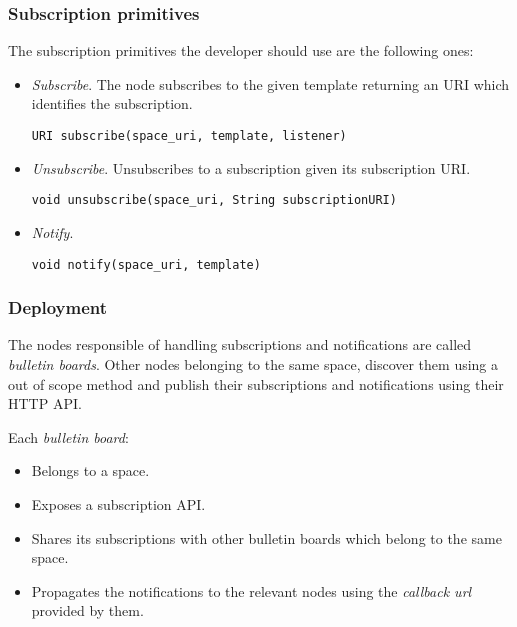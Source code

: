 \subsubsection{Subscription primitives}

The subscription primitives the developer should use are the following ones:
\begin{itemize}
  \item \emph{Subscribe}. The node subscribes to the given template returning an URI which identifies the subscription.
    \begin{verbatim}
URI subscribe(space_uri, template, listener)
    \end{verbatim}
  \item \emph{Unsubscribe}. Unsubscribes to a subscription given its subscription URI.
    \begin{verbatim}
void unsubscribe(space_uri, String subscriptionURI)
    \end{verbatim}
  \item \emph{Notify}.
    \begin{verbatim}
void notify(space_uri, template)
    \end{verbatim}
\end{itemize}


\subsubsection{Deployment}

The nodes responsible of handling subscriptions and notifications are called \emph{bulletin boards}.
Other nodes belonging to the same space, discover them using a out of scope method and publish their subscriptions and notifications using their HTTP API.

Each \emph{bulletin board}:
\begin{itemize}
  \item Belongs to a space.
  \item Exposes a subscription API.
  \item Shares its subscriptions with other bulletin boards which belong to the same space.
  \item Propagates the notifications to the relevant nodes using the \emph{callback url} provided by them.
\end{itemize}


